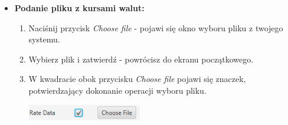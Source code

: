 \documentclass[a4paper,11pt]{article}
\begin{document}
\begin{itemize}
\item \textbf{Podanie pliku z kursami walut:}
\begin{enumerate}
\item Naciśnij przycisk \textit{Choose file} - pojawi się okno wyboru pliku z twojego systemu.
\item Wybierz plik i zatwierdź - powrócisz do ekranu początkowego.
\item W kwadracie obok przycisku \textit{Choose file} pojawi się znaczek, potwierdzający dokonanie operacji wyboru pliku.

\includegraphics[width=5cm]{FileChosen}
\end{enumerate}


\end{itemize}
\end{document}
